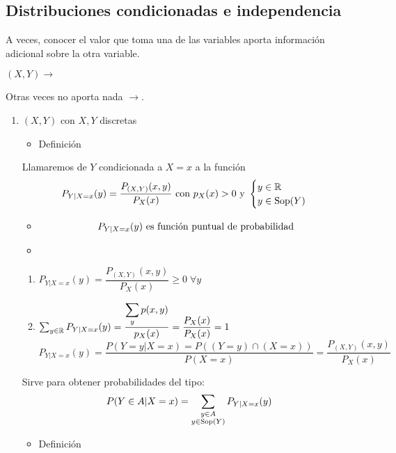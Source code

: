 \subsection{Distribuciones condicionadas e independencia}
A veces, conocer el valor que toma una de las variables aporta información adicional sobre la otra variable.\begin{center}
	$(X,Y)\longrightarrow$
\end{center}Otras veces no aporta nada $\longrightarrow$.
\begin{enumerate}[label=\color{red}\textbf{\Alph*)},leftmargin=*]
	\item {} $(X,Y)$ con $X,Y$ discretas
	\begin{itemize}[label=\color{red}\textbullet, leftmargin=*]
		\item \color{lightblue}Definición
	\end{itemize}
	Llamaremos \fpp de $Y$ condicionada a $X=x$ a la función \[ P_{Y|X=x}(y)=\dfrac{P_{(X,Y)}(x,y)}{P_X(x)}\text{ con }p_X(x)>0\text{ y }\begin{cases}
		y\in\R\\
		y\in\sop(Y)
	\end{cases} \]
	\begin{itemize}[label=\color{red}\textbullet, leftmargin=*]
		\item {} \[P_{Y|X=x}(y)\text{ es \fpp}\]
		\item {}
	\end{itemize}
	\begin{enumerate}[label=\color{lightblue}\arabic*)]
		\item $P_{Y|X=x}(y)=\dfrac{P_{(X,Y)}(x,y)}{P_X(x)}\ge0\;\forall y$
		\item $\sum_{y\in\R}P_{Y|X=x}(y)=\dfrac{\displaystyle\sum_yp(x,y)}{p_X(x)}=\dfrac{P_X(x)}{P_X(x)}=1$\[ P_{Y|X=x}(y)=\dfrac{P(Y=y|X=x)=P\left((Y=y)\cap(X=x)\right)}{P(X=x)}=\dfrac{P_{(X,Y)}(x,y)}{P_X(x)} \]
	\end{enumerate}
	Sirve para obtener probabilidades del tipo: \[ P(Y\in A|X=x)=\sum_{\begin{subarray}{c}
			y\in A\\
			y\in\sop(Y)
	\end{subarray}}P_{Y|X=x}(y) \]
\begin{itemize}[label=\color{red}\textbullet, leftmargin=*]
	\item \color{lightblue}Definición
\end{itemize}

\end{enumerate}
